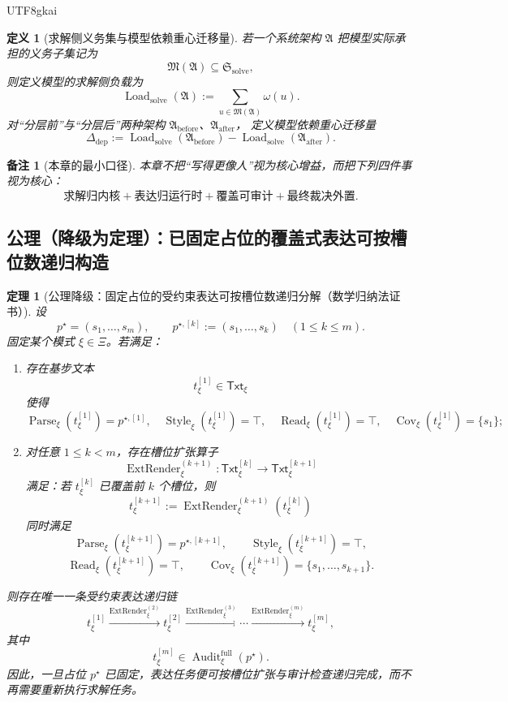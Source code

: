 \documentclass[12pt]{article}
\newtheorem{definition}{定义}[section]
\newtheorem{theorem}{定理}[section]
\newtheorem{remark}{备注}[section]
\newcommand{\Parse}{\operatorname{Parse}}
\newcommand{\Audit}{\operatorname{Audit}}
\newcommand{\Style}{\operatorname{Style}}
\begin{document}
\begin{CJK*}{UTF8}{gkai}
\begin{definition}[求解侧义务集与模型依赖重心迁移量]
若一个系统架构 $\mathfrak{A}$ 把模型实际承担的义务子集记为
\[
  \mathfrak{M}(\mathfrak{A})\subseteq \mathfrak{S}_{\mathrm{solve}},
\]
则定义模型的求解侧负载为
\[
  \operatorname{Load}_{\mathrm{solve}}(\mathfrak{A})
  :=
  \sum_{u\in \mathfrak{M}(\mathfrak{A})}\omega(u).
\]
对“分层前”与“分层后”两种架构 $\mathfrak{A}_{\mathrm{before}}$、$\mathfrak{A}_{\mathrm{after}}$，
定义模型依赖重心迁移量
\[
  \Delta_{\mathrm{dep}}
  :=
  \operatorname{Load}_{\mathrm{solve}}(\mathfrak{A}_{\mathrm{before}})
  -
  \operatorname{Load}_{\mathrm{solve}}(\mathfrak{A}_{\mathrm{after}}).
\]
\end{definition}

\begin{remark}[本章的最小口径]
本章不把“写得更像人”视为核心增益，而把下列四件事视为核心：
\[
  \text{求解归内核}
  +
  \text{表达归运行时}
  +
  \text{覆盖可审计}
  +
  \text{最终裁决外置}.
\]
\end{remark}

\subsection{公理（降级为定理）：已固定占位的覆盖式表达可按槽位数递归构造}
\label{subsec:tex37-ch5-axiom-downgrade}

\begin{theorem}[公理降级：固定占位的受约束表达可按槽位数递归分解（数学归纳法证书）]
\label{thm:tex37-ch5-slot-induction}
设
\[
  p^\star=(s_1,\dots,s_m),
  \qquad
  p^{\star,[k]}:=(s_1,\dots,s_k)\quad (1\le k\le m).
\]
固定某个模式 $\xi\in\Xi$。若满足：
\begin{enumerate}
  \item[\textnormal{(B0)}] 存在基步文本
  \[
    t_\xi^{[1]}\in \mathsf{Txt}_\xi
  \]
  使得
  \[
    \Parse_\xi(t_\xi^{[1]})=p^{\star,[1]},
    \quad
    \Style_\xi(t_\xi^{[1]})=\top,
    \quad
    \operatorname{Read}_\xi(t_\xi^{[1]})=\top,
    \quad
    \operatorname{Cov}_\xi(t_\xi^{[1]})=\{s_1\};
  \]
  \item[\textnormal{(Bk)}] 对任意 $1\le k<m$，存在槽位扩张算子
  \[
    \operatorname{ExtRender}^{(k+1)}_\xi:
    \mathsf{Txt}_\xi^{[k]}
    \to
    \mathsf{Txt}_\xi^{[k+1]}
  \]
  满足：若 $t_\xi^{[k]}$ 已覆盖前 $k$ 个槽位，则
  \[
    t_\xi^{[k+1]}
    :=
    \operatorname{ExtRender}^{(k+1)}_\xi(t_\xi^{[k]})
  \]
  同时满足
  \[
    \Parse_\xi(t_\xi^{[k+1]})=p^{\star,[k+1]},
    \qquad
    \Style_\xi(t_\xi^{[k+1]})=\top,
  \]
  \[
    \operatorname{Read}_\xi(t_\xi^{[k+1]})=\top,
    \qquad
    \operatorname{Cov}_\xi(t_\xi^{[k+1]})=\{s_1,\dots,s_{k+1}\}.
  \]
\end{enumerate}
则存在唯一一条受约束表达递归链
\[
  t_\xi^{[1]}
  \xrightarrow{\operatorname{ExtRender}^{(2)}_\xi}
  t_\xi^{[2]}
  \xrightarrow{\operatorname{ExtRender}^{(3)}_\xi}
  \cdots
  \xrightarrow{\operatorname{ExtRender}^{(m)}_\xi}
  t_\xi^{[m]},
\]
其中
\[
  t_\xi^{[m]}\in \Audit^{\mathrm{full}}_\xi(p^\star).
\]
因此，一旦占位 $p^\star$ 已固定，表达任务便可按槽位扩张与审计检查递归完成，而不再需要重新执行求解任务。
\end{theorem}


\end{CJK*}
\end{document}
